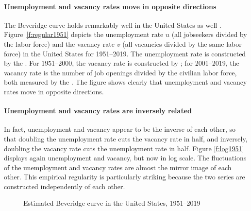 \documentclass[letterpaper,12pt,leqno]{article}
\newcommand{\pdf}{figures.pdf}
\begin{document}
\paragraph{Unemployment and vacancy rates move in opposite directions} The Beveridge curve holds remarkably well in the United States as well \citep{BD89,EMR15}. Figure~\ref{f:regular1951} depicts the unemployment rate $u$ (all jobseekers divided by the labor force) and the vacancy rate $v$ (all vacancies divided by the same labor force) in the United States for 1951--2019. The unemployment rate is constructed by the \citet{UNRATE}. For 1951--2000, the vacancy rate is constructed by \citet{B10d}; for 2001--2019, the vacancy rate is the number of job openings divided by the civilian labor force, both measured by the \citet{CLF16OV,JTSJOL}. The figure shows clearly that unemployment and vacancy rates move in opposite directions. 

\paragraph{Unemployment and vacancy rates are inversely related} In fact, unemployment and vacancy appear to be the inverse of each other, so that doubling the unemployment rate cuts the vacancy rate in half, and inversely, doubling the vacancy rate cuts the unemployment rate in half. Figure \ref{f:log1951} displays again unemployment and vacancy, but now in log scale. The fluctuations of the unemployment and vacancy rates are almost the mirror image of each other. This empirical regularity is particularly striking because the two series are constructed independently of each other.

\begin{figure}[p]
\hfill
{}\vfig
{}\hfill
{}\vfig
{}\hfill
{}
\caption{Estimated Beveridge curve in the United States, 1951--2019}
\label{f:hyperbola}\end{figure}
\end{document}
